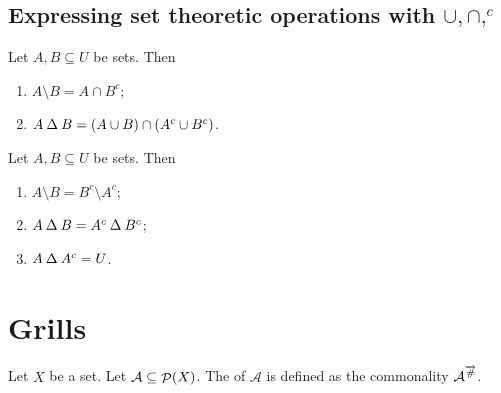 \subsection{Expressing set theoretic operations with $\cup,\cap, ^c$}
\begin{proposition}
Let $A,B\subseteq U$ be sets. Then
\begin{enumerate}
\item $A\setminus B = A \cap B^c$;
\item $A\mathbin{\Delta} B = (A\cup B)\cap (A^c\cup B^c)$.
\end{enumerate}
\end{proposition}
\begin{corollary}
Let $A,B \subseteq U$ be sets. Then
\begin{enumerate}
\item $A\setminus B = B^c\setminus A^c$;
\item $A \mathbin{\Delta} B = A^c \mathbin{\Delta} B^c$;
\item $A \mathbin{\Delta} A^c = U$.
\end{enumerate}
\end{corollary}

\section{Grills}
\begin{definition}
Let $X$ be a set. Let $\mathcal{A} \subseteq \mathop{\mathcal{P}}(X)$. The  of $\mathcal{A}$ is defined as the commonality $\mathcal{A}^{\overrightarrow{\mathbin{\#}}}$.
\end{definition}

